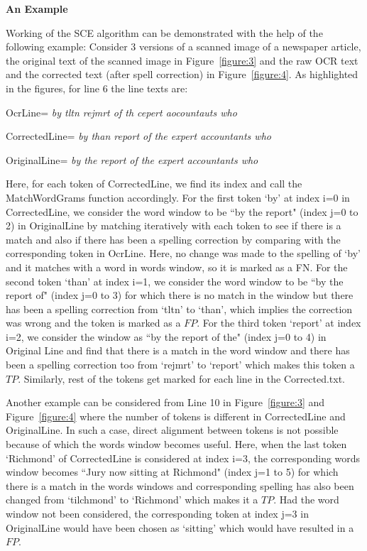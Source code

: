 \documentclass[12pt]{article}
\begin{document}
\textbf{An Example}


Working of the SCE algorithm can be demonstrated with the help of the following example:
Consider 3 versions of a scanned image of a newspaper article,  the original text of the scanned image in Figure~\ref{figure:3} and the raw OCR text and the corrected text (after spell correction) in Figure~\ref{figure:4}. As highlighted in the figures, for line 6 the line texts are:

 OcrLine= \textit{by tltn rejmrt of th cepert aocountauts who}

CorrectedLine= \textit{by than report of the expert accountants who}

OriginalLine= \textit{by the report of the expert accountants who} 

Here, for each token of CorrectedLine, we find its index and call the MatchWordGrams function accordingly. For the first token `by' at index i=0 in CorrectedLine, we consider the word window to be ``by the report" (index j=0 to 2) in OriginalLine by matching iteratively with each token to see if there is a match and also if there has been a spelling correction by comparing with the corresponding token in OcrLine. Here, no change was made to the spelling of `by' and it matches with a word in words window, so it is marked as a FN. For the second token `than' at index i=1, we consider the word window to be ``by the report of" (index j=0 to 3) for which there is no match in the window but there has been a spelling correction from `tltn' to `than', which implies the correction was wrong and the token is marked as a $FP$. For the third token `report' at index i=2, we consider the window as ``by the report of the" (index j=0 to 4) in Original Line and find that there is a match in the word window and there has been a spelling correction too from `rejmrt' to `report' which makes this token a $TP$. Similarly, rest of the tokens get marked for each line in the Corrected.txt. 

Another example can be considered from Line 10 in Figure~\ref{figure:3} and Figure~\ref{figure:4} where the number of tokens is different in CorrectedLine and OriginalLine. In such a case, direct alignment between tokens is not possible because of which the words window becomes useful. Here, when the last token `Richmond' of CorrectedLine is considered at index i=3, the corresponding words window becomes ``Jury now sitting at Richmond" (index j=1 to 5) for which there is a match in the words windows and corresponding spelling has also been changed from `tilchmond' to `Richmond' which makes it a $TP$. Had the word window not been considered, the corresponding token at index j=3 in OriginalLine would have been chosen as `sitting' which would have resulted in a $FP$. 
   
\end{document}

